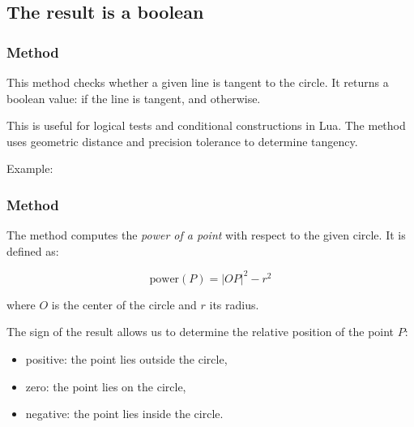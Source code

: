 \subsection{The result is a boolean} %

\subsubsection{Method } %
\label{ssub:method_circle_is__tangent}

This method checks whether a given line is tangent to the circle. It returns a boolean value:  if the line is tangent, and  otherwise.

\medskip
\noindent
This is useful for logical tests and conditional constructions in Lua. The method uses geometric distance and precision tolerance to determine tangency.

\medskip
\noindent
Example:

\begin{tkzexample}[latex=.5\textwidth]
\end{tkzexample}


 \subsubsection{Method } %
 \label{ssub:power}
 
 The  method computes the \emph{power of a point} with respect to the given circle. It is defined as:

 \[
 \text{power}(P) = |OP|^2 - r^2
 \]

 where $O$ is the center of the circle and $r$ its radius.

 \medskip
 \noindent
 The sign of the result allows us to determine the relative position of the point $P$:
 \begin{itemize}
   \item positive: the point lies outside the circle,
   \item zero: the point lies on the circle,
   \item negative: the point lies inside the circle.
 \end{itemize}

